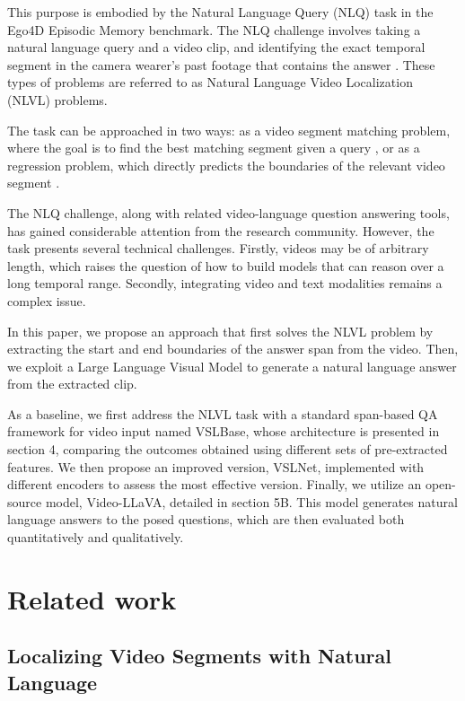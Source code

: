 \documentclass[conference]{IEEEtran}
\begin{document}
This purpose is embodied by the Natural Language Query (NLQ) task in the Ego4D Episodic Memory benchmark. The NLQ challenge involves taking a natural language query and a video clip, and identifying the exact temporal segment in the camera wearer's past footage that contains the answer \cite{b1}. These types of problems are referred to as Natural Language Video Localization (NLVL) problems.

The task can be approached in two ways: as a video segment matching problem, where the goal is to find the best matching segment given a query \cite{b2}, or as a regression problem, which directly predicts the boundaries of the relevant video segment \cite{b3}.

The NLQ challenge, along with related video-language question answering tools, has gained considerable attention from the research community. However, the task presents several technical challenges. Firstly, videos may be of arbitrary length, which raises the question of how to build models that can reason over a long temporal range. Secondly, integrating video and text modalities remains a complex issue.

In this paper, we propose an approach that first solves the NLVL problem by extracting the start and end boundaries of the answer span from the video. Then, we exploit a Large Language Visual Model to generate a natural language answer from the extracted clip.

As a baseline, we first address the NLVL task with a standard span-based QA framework for video input named VSLBase, whose architecture is presented in section 4, comparing the outcomes obtained using different sets of pre-extracted features. We then propose an improved version, VSLNet, implemented with different encoders to assess the most effective version. Finally, we utilize an open-source model, Video-LLaVA, detailed in section 5B. This model generates natural language answers to the posed questions, which are then evaluated both quantitatively and qualitatively.

\section{Related work}

\subsection{Localizing Video Segments with Natural Language}
\end{document}
